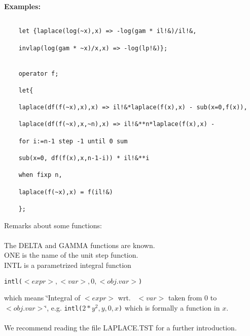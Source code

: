 \documentclass{article}
\begin{document}
\pagebreak
{\bf Examples:}
\begin{verbatim}

    let {laplace(log(~x),x) => -log(gam * il!&)/il!&,

    invlap(log(gam * ~x)/x,x) => -log(lp!&)};


    operator f;

    let{

    laplace(df(f(~x),x),x) => il!&*laplace(f(x),x) - sub(x=0,f(x)),

    laplace(df(f(~x),x,~n),x) => il!&**n*laplace(f(x),x) -

    for i:=n-1 step -1 until 0 sum

    sub(x=0, df(f(x),x,n-1-i)) * il!&**i

    when fixp n,

    laplace(f(~x),x) = f(il!&)

    };

\end{verbatim}


Remarks about some functions: \\
\ \\
The DELTA and GAMMA functions are known. \\
ONE is the name of the unit step function. \\
INTL is a parametrized integral function 
\begin{center}
{\tt intl($<expr>,<var>,0,<obj.var>$)}
\end{center}
which means \char`\"{}Integral of $<expr>$ wrt.~ $<var>$ taken from 0 to $<obj.var>$\char`\"{},
e.g. {\tt intl($2{*}y^2,y,0,x$)} which is formally a function in $x$.
\ \\
\ \\
We recommend reading the file LAPLACE.TST for a further introduction.
\end{document}

